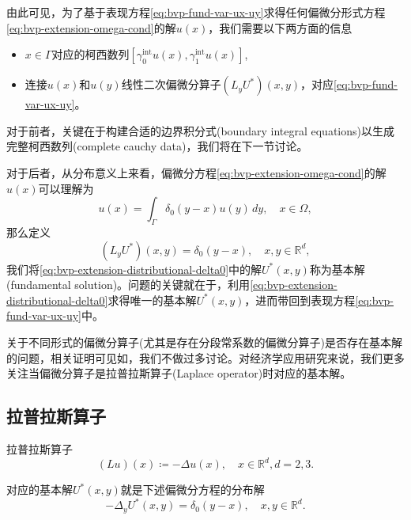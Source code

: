 由此可见，为了基于表现方程\eqref{eq:bvp-fund-var-ux-uy}求得任何偏微分形式方程\eqref{eq:bvp-extension-omega-cond}的解$u(x)$，我们需要以下两方面的信息
\begin{itemize}
  \item $x \in \Gamma$对应的柯西数列$\left[ \gamma_{0}^{\text{int}} u(x) , \gamma_{1}^{\text{int}} u(x) \right]$,
  \item 连接$u(x)$和$u(y)$线性二次偏微分算子$\left(L_y U^{*} \right) (x,y)$，对应\eqref{eq:bvp-fund-var-ux-uy}。
\end{itemize}

对于前者，关键在于构建合适的边界积分式(boundary integral equations)以生成完整柯西数列(complete cauchy data)，我们将在下一节讨论。

对于后者，从分布意义上来看，偏微分方程\eqref{eq:bvp-extension-omega-cond}的解$u(x)$可以理解为
\begin{equation*}
  u(x) = \int_{\Gamma} \delta_0 (y-x) u(y) \, dy, \quad x \in \Omega
,
\end{equation*}
那么定义
\begin{equation}
  \label{eq:bvp-extension-distributional-delta0}
  \left( L_y U^{*} \right) (x,y) = \delta_{0}(y-x), \quad x,y \in \mathbb{R}^{d},
\end{equation}
我们将\eqref{eq:bvp-extension-distributional-delta0}中的解$U^{*}(x,y)$称为基本解(fundamental solution)。问题的关键就在于，利用\eqref{eq:bvp-extension-distributional-delta0}求得唯一的基本解$U^{*}(x,y)$，进而带回到表现方程\eqref{eq:bvp-fund-var-ux-uy}中。

关于不同形式的偏微分算子(尤其是存在分段常系数的偏微分算子)是否存在基本解的问题，相关证明可见如\cite{Hormander:1983hm, Hormander:1983cb, Hormander:1994iv, Hormander:1994ee}，我们不做过多讨论。对经济学应用研究来说，我们更多关注当偏微分算子是拉普拉斯算子(Laplace operator)时对应的基本解。

\subsection{拉普拉斯算子}
拉普拉斯算子
\begin{equation*}
  (L u)(x) \coloneqq   - \Delta u(x), \quad x \in \mathbb{R}^d, d = 2,3.
\end{equation*}

对应的基本解$U^{*}(x,y)$就是下述偏微分方程的分布解
\begin{equation*}
  - \Delta_{y} U^{*} (x,y) = \delta_0(y-x), \quad x,y \in \mathbb{R}^d.
\end{equation*}

